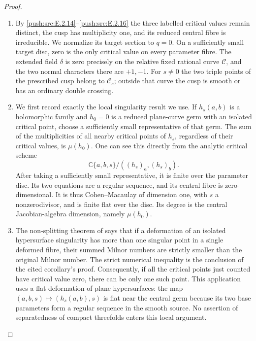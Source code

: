\begin{proof}

\begin{enumerate}[label={$\langle1\rangle$\arabic*.},leftmargin=*]
\item By \ref{push:src:E.2.14}--\ref{push:src:E.2.16} the three labelled critical
values remain distinct, the cusp has multiplicity
one, and its reduced central fibre is irreducible.
We normalize its target section to $q=0$.
On a sufficiently small target disc, zero is the
only critical value on every parameter fibre.
The extended field $\delta$ is zero precisely on
the relative fixed rational curve $\mathcal C$,
and the two normal characters there are $+1,-1$.
For $s\ne0$ the two triple points of the prescribed
cusp belong to $\mathcal C_s$; outside that curve
the cusp is smooth or has an ordinary double crossing.

\item We first record exactly the local singularity result
we use.  If $h_s(a,b)$ is a holomorphic family and
$h_0=0$ is a reduced plane-curve germ with an
isolated critical point, choose a sufficiently
small representative of that germ.  The sum of
the multiplicities of all nearby critical points
of $h_s$, regardless of their critical values,
is $\mu(h_0)$.  One can see this directly from
the analytic critical scheme
\[
 \mathbb C\{a,b,s\}/
       ((h_s)_a,(h_s)_b).
\]
After taking a sufficiently small representative,
it is finite over the parameter disc.  Its two
equations are a regular sequence, and its
central fibre is zero-dimensional.  It is thus
Cohen--Macaulay of dimension one, with $s$ a
nonzerodivisor, and is finite flat over the
disc.  Its degree is the central Jacobian-algebra
dimension, namely $\mu(h_0)$.

\item The non-splitting theorem of
\citet[Theorem 2 and its corollary, pp.~274--275]{Lazzeri1973Root}
says that if a deformation of an isolated
hypersurface singularity has more than one
singular point in a single deformed fibre,
their summed Milnor numbers are strictly
smaller than the original Milnor number.
The strict numerical inequality is the
conclusion of the cited corollary's proof.
Consequently, if all the critical points
just counted have critical value zero,
there can be only one such point.  This
application uses a flat deformation of
plane hypersurfaces: the map
$(a,b,s)\mapsto(h_s(a,b),s)$ is flat near
the central germ because its two base
parameters form a regular sequence in
the smooth source.  No assertion of
separatedness of compact threefolds enters
this local argument.


\end{enumerate}
\end{proof}
